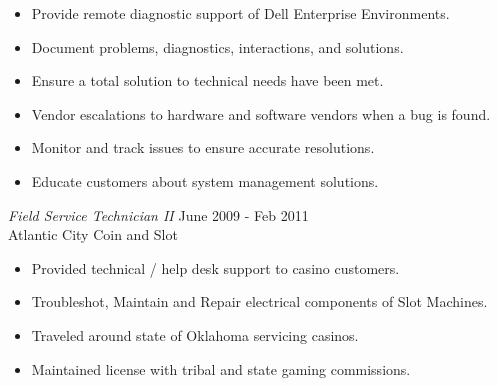 \documentclass[margin]{res}
\begin{document}
\begin{resume}
\begin{itemize}
 		\item Provide remote diagnostic support of Dell Enterprise Environments.
 		\item Document problems, diagnostics, interactions, and solutions.
 		\item Ensure a total solution to technical needs have been met.
 		\item Vendor escalations to hardware and software vendors when a bug is found.
 		\item Monitor and track issues to ensure accurate resolutions. 
 		\item Educate customers about system management solutions.
 	\end{itemize}
 	{\sl Field Service Technician II} \hfill June 2009 - Feb 2011 \\
 	Atlantic City Coin and Slot
 	\begin{itemize}  \itemsep -2pt %
 		\item Provided technical / help desk support to casino customers.
 		\item Troubleshot, Maintain and Repair electrical components of Slot Machines.
 		\item Traveled around state of Oklahoma servicing casinos.
 		\item Maintained license with tribal and state gaming commissions.
 	\end{itemize} 	
 	
 	
\end{resume}
\end{document}
